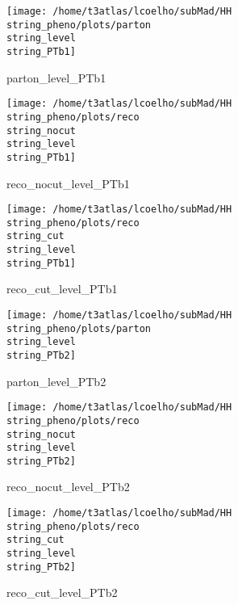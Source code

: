 \documentclass[a4paper,onecolumn,final,11pt]{article}
\begin{document}
 
\begin{figure}[H] 
\centering 
\begin{minipage}{.32\textwidth} 
        \centering 
        \hspace{0cm} 
        \texttt{[image: /home/t3atlas/lcoelho/subMad/HH\\string\_pheno/plots/parton\\string\_level\\string\_PTb1]} 
        \caption{parton_level_PTb1} 
\end{minipage} 
\hfill 
\begin{minipage}{.32\textwidth} 
        \centering 
        \hspace{0cm} 
    \texttt{[image: /home/t3atlas/lcoelho/subMad/HH\\string\_pheno/plots/reco\\string\_nocut\\string\_level\\string\_PTb1]} 
        \caption{reco_nocut_level_PTb1} 
\end{minipage} 
\hfill 
\begin{minipage}{.32\textwidth} 
        \centering 
        \hspace{0cm} 
    \texttt{[image: /home/t3atlas/lcoelho/subMad/HH\\string\_pheno/plots/reco\\string\_cut\\string\_level\\string\_PTb1]} 
        \caption{reco_cut_level_PTb1} 
\end{minipage} 
\end{figure} 
 
\begin{figure}[H] 
\centering 
\begin{minipage}{.32\textwidth} 
        \centering 
        \hspace{0cm} 
        \texttt{[image: /home/t3atlas/lcoelho/subMad/HH\\string\_pheno/plots/parton\\string\_level\\string\_PTb2]} 
        \caption{parton_level_PTb2} 
\end{minipage} 
\hfill 
\begin{minipage}{.32\textwidth} 
        \centering 
        \hspace{0cm} 
    \texttt{[image: /home/t3atlas/lcoelho/subMad/HH\\string\_pheno/plots/reco\\string\_nocut\\string\_level\\string\_PTb2]} 
        \caption{reco_nocut_level_PTb2} 
\end{minipage} 
\hfill 
\begin{minipage}{.32\textwidth} 
        \centering 
        \hspace{0cm} 
    \texttt{[image: /home/t3atlas/lcoelho/subMad/HH\\string\_pheno/plots/reco\\string\_cut\\string\_level\\string\_PTb2]} 
        \caption{reco_cut_level_PTb2} 
\end{minipage} 
\end{figure} 
 
\end{document}
